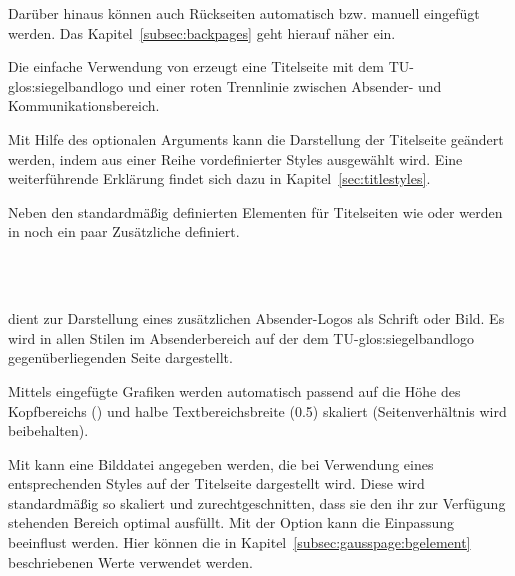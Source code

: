 Darüber hinaus können auch Rückseiten automatisch bzw. manuell eingefügt
werden. Das Kapitel~\ref{subsec:backpages} geht hierauf näher ein.

\begin{Declaration}
\end{Declaration}

Die einfache Verwendung von  erzeugt eine Titelseite
mit dem TU-\gls{glos:siegelbandlogo} und einer roten Trennlinie zwischen Absender- und
Kommunikationsbereich.

Mit Hilfe des optionalen Arguments  kann die Darstellung
der Titelseite geändert werden, indem aus einer Reihe vordefinierter Styles
ausgewählt wird. Eine weiterführende Erklärung findet
sich dazu in Kapitel~\ref{sec:titlestyles}.\bigskip

Neben den standardmäßig definierten Elementen für Titelseiten wie 
oder  werden in \tubslatex noch ein paar Zusätzliche definiert.

\begin{Declaration}
  \\
  \\
\end{Declaration}

\begin{minipage}[t]{0.6\textwidth}
   dient zur Darstellung eines zusätzlichen Absender-Logos als Schrift
  oder Bild. Es wird in allen Stilen im Absenderbereich auf der dem
  TU-\gls{glos:siegelbandlogo} gegenüberliegenden Seite dargestellt.
  
  Mittels  eingefügte Grafiken werden automatisch
  passend auf die Höhe des Kopfbereichs () und
  halbe Textbereichsbreite (0.5) skaliert
  (Seitenverhältnis wird beibehalten).
\end{minipage}
\hfill
\begin{minipage}[t]{0.3\textwidth}
  \vspace*{-1ex}%
\end{minipage}

Mit  kann eine Bilddatei angegeben werden, die bei
Verwendung eines entsprechenden Styles auf der Titelseite dargestellt wird.
Diese wird standardmäßig so skaliert und zurechtgeschnitten, dass sie den ihr
zur Verfügung stehenden Bereich optimal ausfüllt.
Mit der Option  kann die Einpassung beeinflust werden.
Hier können die in Kapitel~\ref{subsec:gausspage:bgelement} beschriebenen Werte
verwendet werden.

